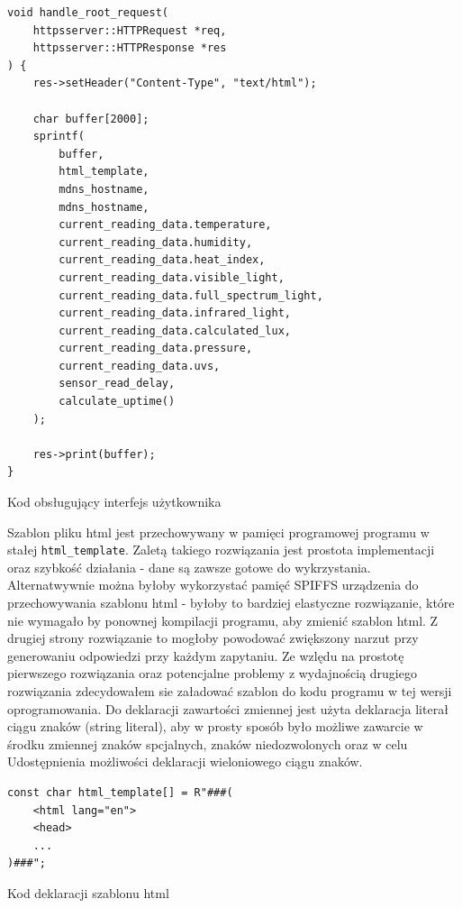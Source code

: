 \documentclass[12pt,a4paper]{article}
\begin{document}
\begin{code}[H]
\begin{verbatim}
void handle_root_request(
    httpsserver::HTTPRequest *req, 
    httpsserver::HTTPResponse *res
) {
    res->setHeader("Content-Type", "text/html");

    char buffer[2000];
    sprintf(
        buffer, 
        html_template,
        mdns_hostname,
        mdns_hostname,
        current_reading_data.temperature,
        current_reading_data.humidity,
        current_reading_data.heat_index,
        current_reading_data.visible_light,
        current_reading_data.full_spectrum_light,
        current_reading_data.infrared_light,
        current_reading_data.calculated_lux,
        current_reading_data.pressure,
        current_reading_data.uvs,
        sensor_read_delay,
        calculate_uptime()
    );

    res->print(buffer);
}
\end{verbatim}
\caption{Kod obsługujący interfejs użytkownika}
\label{user-interface-code}
\end{code}

Szablon pliku html jest przechowywany w pamięci programowej programu w stałej \texttt{html\_template}. Zaletą takiego rozwiązania jest prostota implementacji
oraz szybkość działania - dane są zawsze gotowe do wykrzystania. Alternatwywnie można byłoby wykorzystać pamięć SPIFFS urządzenia do przechowywania szablonu
html - byłoby to bardziej elastyczne rozwiązanie, które nie wymagało by ponownej kompilacji programu, aby zmienić szablon html. Z drugiej strony rozwiązanie to
mogłoby powodować zwiększony narzut przy generowaniu odpowiedzi przy każdym zapytaniu. Ze wzlędu na prostotę pierwszego rozwiązania oraz potencjalne
problemy z wydajnością drugiego rozwiązania zdecydowałem sie załadować szablon do kodu programu w tej wersji oprogramowania.
Do deklaracji zawartości zmiennej jest użyta deklaracja literał ciągu znaków (string literal), aby w prosty sposób było możliwe zawarcie w środku 
zmiennej znaków spcjalnych, znaków niedozwolonych oraz w celu Udostępnienia możliwości deklaracji wieloniowego ciągu znaków.

\begin{code}[H]
\begin{verbatim}
const char html_template[] = R"###(
    <html lang="en">
    <head>
    ...
)###";
\end{verbatim}
\caption{Kod deklaracji szablonu html}
\label{html-template-code}
\end{code}
\end{document}
